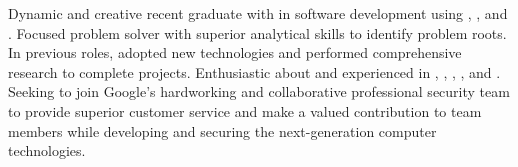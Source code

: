 

\begin{cvparagraph}

Dynamic and creative recent  graduate with  in software development using , ,  and . Focused problem solver with superior analytical skills to identify problem roots. In previous roles, adopted new technologies and performed comprehensive research to complete projects. Enthusiastic about and experienced in , , , ,  and . Seeking to join Google's hardworking and collaborative professional security team to provide superior customer service and make a valued contribution to team members  while developing and securing the next-generation computer technologies.
\end{cvparagraph}
